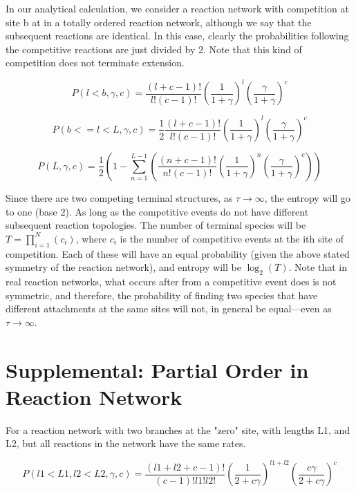 \documentclass{article}
\begin{document}
In our analytical calculation, we consider a reaction network with competition at site b at in a totally ordered reaction network, although we say that the subsequent reactions are identical. In this case, clearly the probabilities following the competitive reactions are just divided by 2. Note that this kind of competition does not terminate extension. 

\begin{equation}
P(l<b,\gamma,c)=\frac{(l+c-1)!}{l!(c-1)!}(\frac{1}{1+\gamma})^l(\frac{\gamma}{1+\gamma})^c
\end{equation}

\begin{equation}
P(b<=l<L,\gamma,c)=\frac{1}{2}\frac{(l+c-1)!}{l!(c-1)!}(\frac{1}{1+\gamma})^l(\frac{\gamma}{1+\gamma})^c
\end{equation}

\begin{equation}
P(L,\gamma,c)=\frac{1}{2}(1-\sum_{n=1}^{L-1}(\frac{(n+c-1)!}{n!(c-1)!}(\frac{1}{1+\gamma})^n(\frac{\gamma}{1+\gamma})^c))
\end{equation}


Since there are two competing terminal structures, as $\tau \rightarrow\infty$, the entropy will go to one (base 2). As long as the competitive events do not have different subsequent reaction topologies.  The number of terminal species will be $T=\prod_{i=1}^N (c_i)$, where $c_i$ is the number of competitive events at the ith site of competition. Each of these will have an equal probability (given the above stated symmetry of the reaction network), and entropy will be $\log_2(T)$. Note that in real reaction networks, what occurs after from a competitive event does is not symmetric, and therefore, the probability of finding two species that have different attachments at the same sites will not, in general be equal---even as  $\tau \rightarrow\infty$.


\section*{Supplemental: Partial Order in Reaction Network}

For a reaction network with two branches at the "zero" site, with lengths L1, and L2, but all reactions in the network have the same	 rates.

\begin{equation}
P(l1<L1,l2<L2,\gamma,c)=\frac{(l1+l2+c-1)!}{(c-1)!l1!l2!}(\frac{1}{2+c\gamma})^{l1+l2}(\frac{c\gamma}{2+c\gamma})^c
\end{equation}
\end{document}
